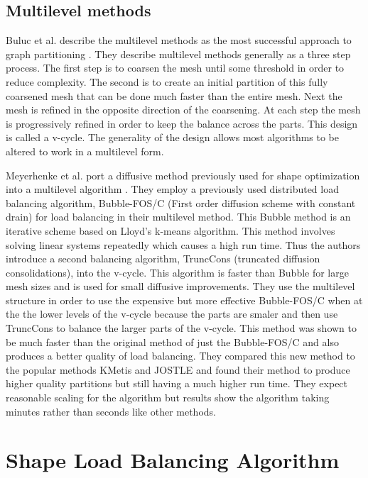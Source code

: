 \documentclass{thesis}
\begin{document}
\section{Multilevel methods}
Buluc et al. describe the multilevel methods as the most successful approach to 
graph partitioning \cite{surveygraph}. They describe multilevel methods 
generally as a three step process. The first step is to coarsen the mesh 
until some threshold in order to reduce complexity. The second is to create 
an initial partition of this fully coarsened mesh that can be done much 
faster than the entire mesh. Next the mesh is refined in the opposite direction
of the coarsening. At each step the mesh is progressively refined in order to
keep the balance across the parts. This design is called a v-cycle. The 
generality of the design allows most algorithms to be altered to work in a 
multilevel form. 

Meyerhenke et al. port a diffusive method previously used for 
shape optimization into a multilevel algorithm \cite{multidiffuse}. They 
employ a 
previously used distributed load balancing algorithm, Bubble-FOS/C (First order
diffusion scheme with constant drain) for load balancing in their multilevel
method. This Bubble method is an iterative scheme based on Lloyd's k-means 
algorithm. This method involves solving linear systems repeatedly which causes 
a high run time. Thus the authors introduce a second balancing algorithm, 
TruncCons (truncated diffusion consolidations), into the v-cycle. This 
algorithm is faster than Bubble for large mesh sizes and is used for small
diffusive improvements. They use the multilevel structure in order to use 
the expensive but more effective Bubble-FOS/C when at the the lower levels of 
the v-cycle because the parts are smaler and then use TruncCons to balance the 
larger parts of the v-cycle. 
This method was shown to be much faster than the original method 
of just the Bubble-FOS/C and also produces a better quality of load balancing. 
They compared this new method to the popular methods KMetis and JOSTLE and 
found their method to produce higher quality partitions but still having a
much higher run time. They expect reasonable scaling for the algorithm but 
results show the algorithm taking minutes rather than seconds like other 
methods.

\chapter{Shape Load Balancing Algorithm}
\end{document}
